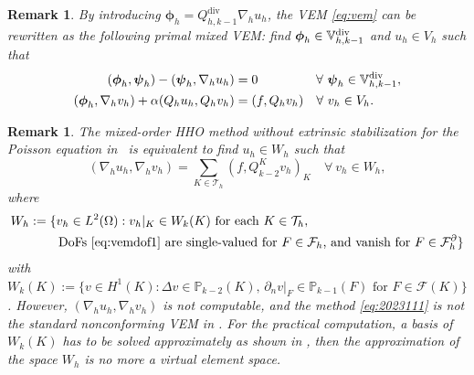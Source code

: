 \documentclass[10pt]{amsart}
\newtheorem{remark}[theorem]{Remark}
\renewcommand{\div}{\operatorname{div}}
\numberwithin{equation}{section}
\begin{document}
\begin{remark}\rm
By introducing $\boldsymbol{\phi}_h=Q_{h,k-1}^{\div}\nabla_h u_h$, the VEM \eqref{eq:vem} can be rewritten as the following primal mixed VEM: find $\boldsymbol{\phi}_h\in\mathbb{V}_{h,k-1}^{\rm div}$ and $u_h\in V_h$ such that
\begin{equation*}
\begin{aligned}
(\boldsymbol{\phi}_h, \boldsymbol{\psi}_h) - (\boldsymbol{\psi}_h, \nabla_h u_h)&=0 \quad\quad\quad\quad\;\;\forall~\boldsymbol{\psi}_h\in\mathbb{V}_{h,k-1}^{\rm div},\\
(\boldsymbol{\phi}_h, \nabla_h v_h)+\alpha(Q_hu_h, Q_hv_h)&=(f, Q_hv_h)\quad\forall~v_h\in V_h.
\end{aligned}
\end{equation*}
\end{remark}

\begin{remark}\rm
The mixed-order HHO method without extrinsic stabilization for the Poisson equation in~\cite{CicuttinErnLemaire2019} is equivalent to find $u_h\in W_h$ such that
\begin{equation}\label{eq:2023111}    
(\nabla_h u_h, \nabla_h v_h)=\sum_{K\in\mathcal T_h}(f, Q_{k-2}^Kv_h)_K\quad\forall~v_h\in W_h,
\end{equation}
where
\begin{align*}
W_h&:=\{v_h\in L^2(\Omega): v_h|_K\in W_k(K) \textrm{ for each } K\in\mathcal T_h, \textrm{  } \\
&\qquad\; \textrm{DoFs \eqref{eq:vemdof1} are single-valued for $F\in\mathcal F_h$, and vanish for $F\in \mathcal F_h^{\partial}$}\}
\end{align*}  
with $W_k(K):=\{v\in H^1(K) : \Delta v\in\mathbb P_{k-2}(K),\, \partial_nv|_F\in\mathbb P_{k-1}(F)\textrm{ for }F\in\mathcal F(K)\}$.
However, $(\nabla_h u_h, \nabla_h v_h)$ is not computable, %
and the method \eqref{eq:2023111} is not the standard nonconforming VEM in \cite{AyusodeDiosLipnikovManzini2016}. For the practical computation, a basis of $W_k(K)$ has to be solved approximately as shown in \cite[Remark 4.1]{CicuttinErnLemaire2019}, then the approximation of the space $W_h$ is no more a virtual element space. 
\end{remark}
\end{document}
